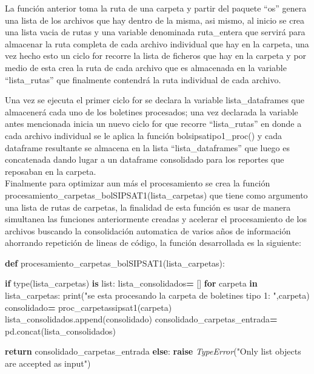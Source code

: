 \documentclass[
]{book}
\newenvironment{Shaded}{\begin{snugshade}}{\end{snugshade}}
\newcommand{\BuiltInTok}[1]{#1}
\newcommand{\ControlFlowTok}[1]{\textcolor[rgb]{0.13,0.29,0.53}{\textbf{#1}}}
\newcommand{\KeywordTok}[1]{\textcolor[rgb]{0.13,0.29,0.53}{\textbf{#1}}}
\newcommand{\NormalTok}[1]{#1}
\newcommand{\OperatorTok}[1]{\textcolor[rgb]{0.81,0.36,0.00}{\textbf{#1}}}
\newcommand{\PreprocessorTok}[1]{\textcolor[rgb]{0.56,0.35,0.01}{\textit{#1}}}
\newcommand{\StringTok}[1]{\textcolor[rgb]{0.31,0.60,0.02}{#1}}
\begin{document}
La función anterior toma la ruta de una carpeta y partir del paquete ``os'' genera una lista de los archivos que hay dentro de la misma, asi mismo, al inicio se crea una lista vacia de rutas y una variable denominada ruta\_entera que servirá para almacenar la ruta completa de cada archivo individual que hay en la carpeta, una vez hecho esto un ciclo for recorre la lista de ficheros que hay en la carpeta y por medio de esta crea la ruta de cada archivo que es almacenada en la variable ``lista\_rutas'' que finalmente contendrá la ruta individual de cada archivo.

Una vez se ejecuta el primer ciclo for se declara la variable lista\_dataframes que almacenerá cada uno de los boletines procesados; una vez declarada la variable antes mencionada inicia un nuevo ciclo for que recorre ``lista\_rutas'' en donde a cada archivo individual se le aplica la función bolsipsatipo1\_proc() y cada dataframe resultante se almacena en la lista ``lista\_dataframes'' que luego es concatenada dando lugar a un dataframe consolidado para los reportes que reposaban en la carpeta.\\
Finalmente para optimizar aun más el procesamiento se crea la función procesamiento\_carpetas\_bolSIPSAT1(lista\_carpetas) que tiene como argumento una lista de rutas de carpetas, la finalidad de esta función es usar de manera simultanea las funciones anteriormente creadas y acelerar el procesamiento de los archivos buscando la consolidación automatica de varios años de información ahorrando repetición de lineas de código, la función desarrollada es la siguiente:

\begin{Shaded}
\begin{Highlighting}[]

\KeywordTok{def}\NormalTok{ procesamiento\_carpetas\_bolSIPSAT1(lista\_carpetas):}
    
    \ControlFlowTok{if} \BuiltInTok{type}\NormalTok{(lista\_carpetas) }\KeywordTok{is} \BuiltInTok{list}\NormalTok{:}
\NormalTok{        lista\_consolidados}\OperatorTok{=}\NormalTok{ []}
        \ControlFlowTok{for}\NormalTok{ carpeta }\KeywordTok{in}\NormalTok{ lista\_carpetas:}
            \BuiltInTok{print}\NormalTok{(}\StringTok{"se esta procesando la carpeta de boletines tipo 1: "}\NormalTok{,carpeta)}
\NormalTok{            consolidado}\OperatorTok{=}\NormalTok{ proc\_carpetassipsat1(carpeta)}
\NormalTok{            lista\_consolidados.append(consolidado)}
\NormalTok{            consolidado\_carpetas\_entrada}\OperatorTok{=}\NormalTok{ pd.concat(lista\_consolidados)}
        
        \ControlFlowTok{return}\NormalTok{ consolidado\_carpetas\_entrada}
    \ControlFlowTok{else}\NormalTok{:}
        \ControlFlowTok{raise} \PreprocessorTok{TypeError}\NormalTok{(}\StringTok{"Only list objects are accepted as input"}\NormalTok{)}
\end{Highlighting}
\end{Shaded}
\end{document}
